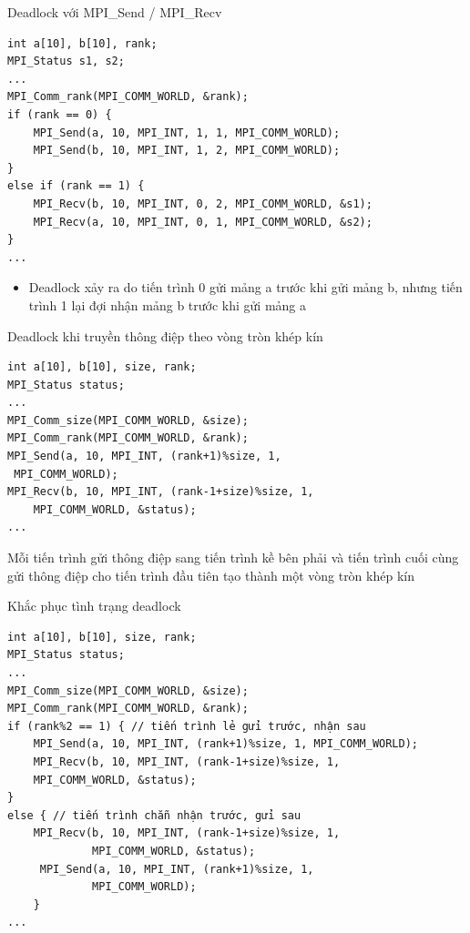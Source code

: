 \documentclass[10pt]{beamer}
\theoremstyle{remark}
\numberwithin{algocf}{section}
\numberwithin{equation}{section}
\numberwithin{dl}{section}
\numberwithin{figure}{section}
\begin{document}
\begin{frame}{Deadlock với MPI\_Send / MPI\_Recv}
    \begin{verbatim}
int a[10], b[10], rank;
MPI_Status s1, s2;
...
MPI_Comm_rank(MPI_COMM_WORLD, &rank);
if (rank == 0) {
    MPI_Send(a, 10, MPI_INT, 1, 1, MPI_COMM_WORLD);
    MPI_Send(b, 10, MPI_INT, 1, 2, MPI_COMM_WORLD);
}
else if (rank == 1) {
    MPI_Recv(b, 10, MPI_INT, 0, 2, MPI_COMM_WORLD, &s1);
    MPI_Recv(a, 10, MPI_INT, 0, 1, MPI_COMM_WORLD, &s2);
}
...
    \end{verbatim}

    \begin{itemize}
        \item Deadlock xảy ra do tiến trình 0 gửi mảng a trước khi gửi mảng b, nhưng tiến trình 1 lại đợi nhận mảng b trước khi gửi mảng a
    \end{itemize}
\end{frame}

\begin{frame}[fragile]{Deadlock khi truyền thông điệp theo vòng tròn khép kín}
    \begin{verbatim}
int a[10], b[10], size, rank;
MPI_Status status;
...
MPI_Comm_size(MPI_COMM_WORLD, &size);
MPI_Comm_rank(MPI_COMM_WORLD, &rank);
MPI_Send(a, 10, MPI_INT, (rank+1)%size, 1,
 MPI_COMM_WORLD);
MPI_Recv(b, 10, MPI_INT, (rank-1+size)%size, 1,
    MPI_COMM_WORLD, &status);
... 
    \end{verbatim}
    Mỗi tiến trình gửi thông điệp sang tiến trình kề bên phải và tiến trình cuối cùng gửi thông điệp cho tiến trình đầu tiên tạo thành một vòng tròn khép kín
\end{frame}

\begin{frame}{Khắc phục tình trạng deadlock}
    \begin{verbatim}
int a[10], b[10], size, rank;
MPI_Status status;
...
MPI_Comm_size(MPI_COMM_WORLD, &size);
MPI_Comm_rank(MPI_COMM_WORLD, &rank);
if (rank%2 == 1) { // tiến trình lẻ gửi trước, nhận sau
    MPI_Send(a, 10, MPI_INT, (rank+1)%size, 1, MPI_COMM_WORLD);
    MPI_Recv(b, 10, MPI_INT, (rank-1+size)%size, 1,
    MPI_COMM_WORLD, &status);
}
else { // tiến trình chẵn nhận trước, gửi sau
    MPI_Recv(b, 10, MPI_INT, (rank-1+size)%size, 1,
             MPI_COMM_WORLD, &status);
     MPI_Send(a, 10, MPI_INT, (rank+1)%size, 1,
             MPI_COMM_WORLD);
    }
...     
    \end{verbatim}
\end{frame}
\end{document}
